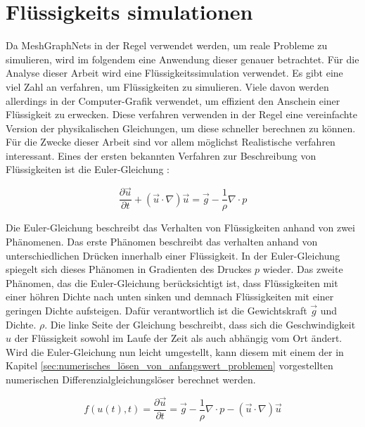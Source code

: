 
\section{Flüssigkeits simulationen} \label{sec:simulationen}

Da MeshGraphNets in der Regel verwendet werden, um reale Probleme zu simulieren, 
wird im folgendem eine Anwendung dieser genauer betrachtet.
Für die Analyse dieser Arbeit wird eine Flüssigkeitssimulation verwendet.
Es gibt eine viel Zahl an verfahren, um Flüssigkeiten zu simulieren.
Viele davon werden allerdings in der Computer-Grafik verwendet, um 
effizient den Anschein einer Flüssigkeit zu erwecken.
Diese verfahren verwenden in der Regel eine vereinfachte Version der physikalischen Gleichungen,
um diese schneller berechnen zu können.
Für die Zwecke dieser Arbeit sind vor allem möglichst Realistische verfahren interessant.
Eines der ersten bekannten Verfahren zur Beschreibung von Flüssigkeiten ist die Euler-Gleichung \cite[Kapitel~1]{navier_stokes}:

$$
\frac{\partial \vec{u}}{\partial t} + (\vec{u} \cdot \nabla) \vec{u} =  \vec{g} - \frac{1}{\rho} \nabla \cdot p
$$

Die Euler-Gleichung beschreibt das Verhalten von Flüssigkeiten anhand von zwei Phänomenen.
Das erste Phänomen beschreibt das verhalten anhand von unterschiedlichen Drücken innerhalb einer Flüssigkeit.
In der Euler-Gleichung spiegelt sich dieses Phänomen in Gradienten des Druckes $p$ wieder.
Das zweite Phänomen, das die Euler-Gleichung berücksichtigt ist, dass Flüssigkeiten mit
einer höhren Dichte nach unten sinken und demnach Flüssigkeiten mit einer geringen Dichte aufsteigen.
Dafür verantwortlich ist die Gewichtskraft $\vec{g}$ und Dichte. $\rho$.
Die linke Seite der Gleichung beschreibt, dass sich die Geschwindigkeit $u$ der Flüssigkeit sowohl im Laufe 
der Zeit als auch abhängig vom Ort ändert.
Wird die Euler-Gleichung nun leicht umgestellt, 
kann diesem mit einem der in Kapitel \ref{sec:numerisches_lösen_von_anfangswert_problemen} vorgestellten 
numerischen Differenzialgleichungslöser berechnet werden.

$$
f(u(t), t) = \frac{\partial \vec{u}}{\partial t}  =  \vec{g} - \frac{1}{\rho} \nabla \cdot p -  (\vec{u} \cdot \nabla) \vec{u}
$$

